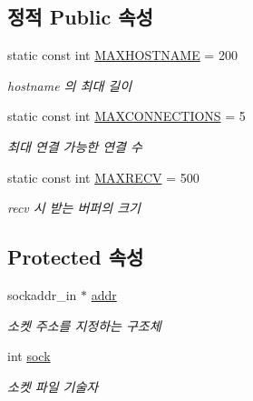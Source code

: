 \subsection*{정적 Public 속성}
\begin{DoxyCompactItemize}
\item 
\mbox{\label{classsock_1_1_socket_ac1b998d21d786e8a40019079581cbe5a}} 
static const int \hyperlink{classsock_1_1_socket_ac1b998d21d786e8a40019079581cbe5a}{M\+A\+X\+H\+O\+S\+T\+N\+A\+ME} = 200
\begin{DoxyCompactList}\small\item\em hostname 의 최대 길이 \end{DoxyCompactList}\item 
\mbox{\label{classsock_1_1_socket_a9f25b6bda1196c775ef4d71db6d74d1c}} 
static const int \hyperlink{classsock_1_1_socket_a9f25b6bda1196c775ef4d71db6d74d1c}{M\+A\+X\+C\+O\+N\+N\+E\+C\+T\+I\+O\+NS} = 5
\begin{DoxyCompactList}\small\item\em 최대 연결 가능한 연결 수 \end{DoxyCompactList}\item 
\mbox{\label{classsock_1_1_socket_a01030a5c8737ce91eb7d03ffb8793bad}} 
static const int \hyperlink{classsock_1_1_socket_a01030a5c8737ce91eb7d03ffb8793bad}{M\+A\+X\+R\+E\+CV} = 500
\begin{DoxyCompactList}\small\item\em recv 시 받는 버퍼의 크기 \end{DoxyCompactList}\end{DoxyCompactItemize}
\subsection*{Protected 속성}
\begin{DoxyCompactItemize}
\item 
\mbox{\label{classsock_1_1_socket_a3a0ac1ff8d4b3ace6fc85c75f8174299}} 
sockaddr\+\_\+in $\ast$ \hyperlink{classsock_1_1_socket_a3a0ac1ff8d4b3ace6fc85c75f8174299}{addr}
\begin{DoxyCompactList}\small\item\em 소켓 주소를 지정하는 구조체 \end{DoxyCompactList}\item 
\mbox{\label{classsock_1_1_socket_a01040adb35eea5ad276090b9db112f4a}} 
int \hyperlink{classsock_1_1_socket_a01040adb35eea5ad276090b9db112f4a}{sock}
\begin{DoxyCompactList}\small\item\em 소켓 파일 기술자 \end{DoxyCompactList}\end{DoxyCompactItemize}


